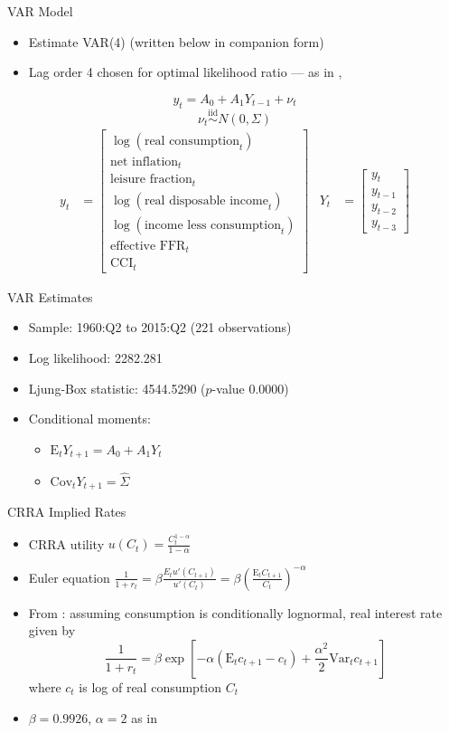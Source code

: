 \documentclass{beamer}
\def\E{\text{E}}
\def\Var{\text{Var}}
\def\Cov{\text{Cov}}
\begin{document}
\begin{frame}{VAR Model}
\begin{itemize}
\item Estimate VAR(4) (written below in companion form)
\item Lag order 4 chosen for optimal likelihood ratio --- as in \cite{fuhrer00}, \cite{collard11}
\end{itemize}
$$y_t = A_0 + A_1 Y_{t-1} + \nu_t$$
$$\nu_t \overset{\text{iid}}{\sim} N(0, \Sigma)$$
\begin{align*}
y_t &= \begin{bmatrix} \log(\text{real consumption}_t) \\ \text{net inflation}_t \\ \text{leisure fraction}_t \\ \log(\text{real disposable income}_t) \\ \log(\text{income less consumption}_t) \\ \text{effective FFR}_t \\ \text{CCI}_t \end{bmatrix} &
Y_t &= \begin{bmatrix} y_t \\ y_{t-1} \\ y_{t-2} \\ y_{t-3} \end{bmatrix}
\end{align*}
\end{frame}

\begin{frame}{VAR Estimates}
\begin{itemize}
\item Sample: 1960:Q2 to 2015:Q2 (221 observations)
\item Log likelihood: 2282.281
\item Ljung-Box statistic: 4544.5290 ($p$-value 0.0000) \bigskip
\item Conditional moments:
  \begin{itemize}
  \item $\E_t Y_{t+1} = A_0 + A_1 Y_t$
  \item $\Cov_t Y_{t+1} = \hat{\Sigma}$
  \end{itemize}
\end{itemize}
\end{frame}

\begin{frame}{CRRA Implied Rates}
\begin{itemize}
\item CRRA utility $u(C_t) = \frac{C_t^{1-\alpha}}{1-\alpha}$
\item Euler equation $\frac{1}{1+r_t} = \beta \frac{E_t u'(C_{t+1})}{u'(C_t)} = \beta \left( \frac{\E_t C_{t+1}}{C_t} \right)^{-\alpha}$
\item From \cite{canzoneri07}: assuming consumption is conditionally lognormal, real interest rate given by
$$\frac{1}{1+r_t} = \beta \exp\left[ -\alpha(\E_t c_{t+1} - c_t) + \frac{\alpha^2}{2} \Var_t c_{t+1} \right]$$ where $c_t$ is log of real consumption $C_t$
\item $\beta = 0.9926$, $\alpha = 2$ as in \cite{collard11}
\end{itemize}
\end{frame}
\end{document}
